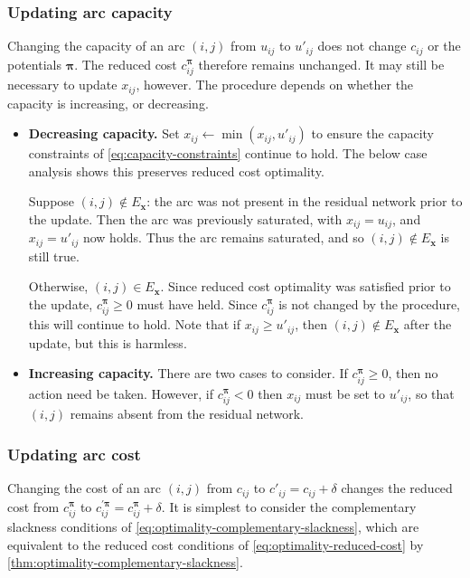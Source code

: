 \subsubsection{Updating arc capacity}

Changing the capacity of an arc $(i,j)$ from $u_{ij}$ to $u'_{ij}$ does not change $c_{ij}$ or the potentials $\boldsymbol{\pi}$. The reduced cost $c_{ij}^{\boldsymbol{\pi}}$ therefore remains unchanged. It may still be necessary to update $x_{ij}$, however. The procedure depends on whether the capacity is increasing, or decreasing.

\begin{itemize}
    \item \textbf{Decreasing capacity.} Set $x_{ij} \gets \min\left(x_{ij},u'_{ij}\right)$ to ensure the capacity constraints of \cref{eq:capacity-constraints} continue to hold\footnotemark. The below case analysis shows this preserves reduced cost optimality.
    
    Suppose $(i,j) \not \in E_\mathbf{x}$: the arc was not present in the residual network prior to the update. Then the arc was previously saturated, with $x_{ij} = u_{ij}$, and $x_{ij} = u'_{ij}$ now holds. Thus the arc remains saturated, and so $(i,j) \not \in E_\mathbf{x}$ is still true.
    
    Otherwise, $(i,j) \in E_\mathbf{x}$. Since reduced cost optimality was satisfied prior to the update, $c_{ij}^{\boldsymbol{\pi}} \geq 0$ must have held. Since $c_{ij}^{\boldsymbol{\pi}}$ is not changed by the procedure, this will continue to hold. Note that if $x_{ij} \geq u'_{ij}$, then $(i,j) \not \in E_\mathbf{x}$ after the update, but this is harmless.
    \item \textbf{Increasing capacity.} There are two cases to consider. If $c_{ij}^{\boldsymbol{\pi}} \geq 0$, then no action need be taken. However, if $c_{ij}^{\boldsymbol{\pi}} < 0$ then $x_{ij}$ must be set to $u'_{ij}$, so that $(i,j)$ remains absent from the residual network.
\end{itemize}

\subsubsection{Updating arc cost}

Changing the cost of an arc $(i,j)$ from $c_{ij}$ to $c'_{ij} = c_{ij} + \delta$ changes the reduced cost from $c_{ij}^{\boldsymbol{\pi}}$ to $c_{ij}^{\prime\boldsymbol{\pi}} = c_{ij}^{\boldsymbol{\pi}} + \delta$. It is simplest to consider the complementary slackness conditions of \cref{eq:optimality-complementary-slackness}, which are equivalent to the reduced cost conditions of \cref{eq:optimality-reduced-cost} by \cref{thm:optimality-complementary-slackness}.

